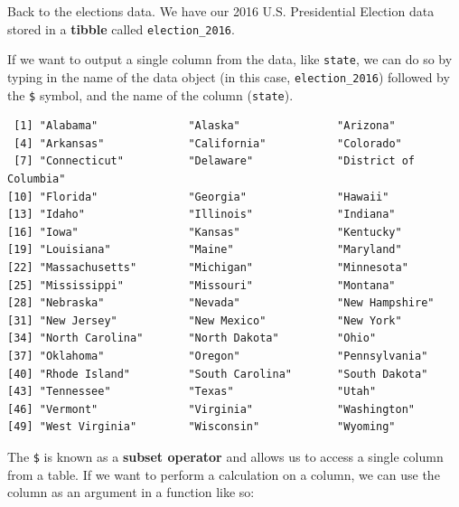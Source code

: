 \documentclass[
  letterpaper,
]{book}
\newenvironment{Shaded}{\begin{snugshade}}{\end{snugshade}}
\newcommand{\AttributeTok}[1]{\textcolor[rgb]{0.40,0.45,0.13}{#1}}
\newcommand{\CommentTok}[1]{\textcolor[rgb]{0.37,0.37,0.37}{#1}}
\newcommand{\ConstantTok}[1]{\textcolor[rgb]{0.56,0.35,0.01}{#1}}
\newcommand{\FunctionTok}[1]{\textcolor[rgb]{0.28,0.35,0.67}{#1}}
\newcommand{\NormalTok}[1]{\textcolor[rgb]{0.00,0.23,0.31}{#1}}
\newcommand{\SpecialCharTok}[1]{\textcolor[rgb]{0.37,0.37,0.37}{#1}}
\begin{document}
Back to the elections data. We have our 2016 U.S. Presidential Election
data stored in a \textbf{tibble} called \texttt{election\_2016}.

If we want to output a single column from the data, like \texttt{state},
we can do so by typing in the name of the data object (in this case,
\texttt{election\_2016}) followed by the \texttt{\$} symbol, and the
name of the column (\texttt{state}).

\begin{Shaded}
\end{Shaded}

\begin{verbatim}
 [1] "Alabama"              "Alaska"               "Arizona"             
 [4] "Arkansas"             "California"           "Colorado"            
 [7] "Connecticut"          "Delaware"             "District of Columbia"
[10] "Florida"              "Georgia"              "Hawaii"              
[13] "Idaho"                "Illinois"             "Indiana"             
[16] "Iowa"                 "Kansas"               "Kentucky"            
[19] "Louisiana"            "Maine"                "Maryland"            
[22] "Massachusetts"        "Michigan"             "Minnesota"           
[25] "Mississippi"          "Missouri"             "Montana"             
[28] "Nebraska"             "Nevada"               "New Hampshire"       
[31] "New Jersey"           "New Mexico"           "New York"            
[34] "North Carolina"       "North Dakota"         "Ohio"                
[37] "Oklahoma"             "Oregon"               "Pennsylvania"        
[40] "Rhode Island"         "South Carolina"       "South Dakota"        
[43] "Tennessee"            "Texas"                "Utah"                
[46] "Vermont"              "Virginia"             "Washington"          
[49] "West Virginia"        "Wisconsin"            "Wyoming"             
\end{verbatim}

The \texttt{\$} is known as a \textbf{subset operator} and allows us to
access a single column from a table. If we want to perform a calculation
on a column, we can use the column as an argument in a function like so:

\begin{Shaded}
\end{Shaded}
\end{document}
